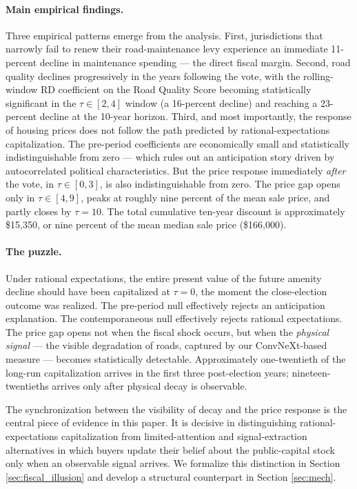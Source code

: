 \paragraph{Main empirical findings.}
Three empirical patterns emerge from the analysis. First, jurisdictions that narrowly fail to renew their road-maintenance levy experience an immediate 11-percent decline in maintenance spending --- the direct fiscal margin. Second, road quality declines progressively in the years following the vote, with the rolling-window RD coefficient on the Road Quality Score becoming statistically significant in the $\tau \in [2,4]$ window (a 16-percent decline) and reaching a 23-percent decline at the 10-year horizon. Third, and most importantly, the response of housing prices does not follow the path predicted by rational-expectations capitalization. The pre-period coefficients are economically small and statistically indistinguishable from zero --- which rules out an anticipation story driven by autocorrelated political characteristics. But the price response immediately {\it after} the vote, in $\tau \in [0,3]$, is also indistinguishable from zero. The price gap opens only in $\tau \in [4,9]$, peaks at roughly nine percent of the mean sale price, and partly closes by $\tau = 10$. The total cumulative ten-year discount is approximately \$15,350, or nine percent of the mean median sale price (\$166,000).

\paragraph{The puzzle.}
Under rational expectations, the entire present value of the future amenity decline should have been capitalized at $\tau = 0$, the moment the close-election outcome was realized. The pre-period null effectively rejects an anticipation explanation. The contemporaneous null effectively rejects rational expectations. The price gap opens not when the fiscal shock occurs, but when the {\it physical signal} --- the visible degradation of roads, captured by our ConvNeXt-based measure --- becomes statistically detectable. Approximately one-twentieth of the long-run capitalization arrives in the first three post-election years; nineteen-twentieths arrives only after physical decay is observable.

The synchronization between the visibility of decay and the price response is the central piece of evidence in this paper. It is decisive in distinguishing rational-expectations capitalization from limited-attention and signal-extraction alternatives in which buyers update their belief about the public-capital stock only when an observable signal arrives. We formalize this distinction in Section \ref{sec:fiscal_illusion} and develop a structural counterpart in Section \ref{sec:mech}.

